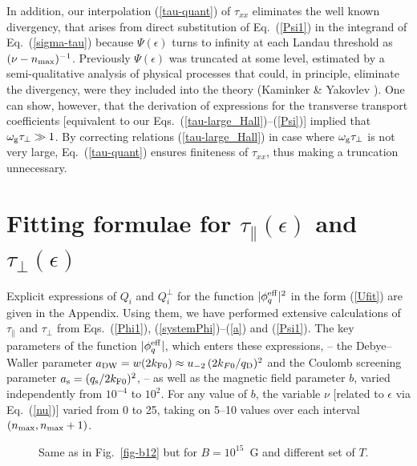 \documentclass{aa}
\newcommand{\req}[1]{Eq.~(\ref{#1})}
\newcommand{\omg}{\omega_{\rm g}}
\begin{document}
In addition, our interpolation (\ref{tau-quant}) of $\tau_{xx}$
eliminates the well known divergency,
that arises from direct substitution of \req{Psi1}
in the integrand of \req{sigma-tau} because
$\Psi(\epsilon)$ turns to infinity at each 
Landau threshold as $(\nu - n_{\rm max})^{-1}$.
Previously $\Psi(\epsilon)$
was truncated at some level, estimated 
by a semi-qualitative analysis of physical
processes that could, in principle, eliminate the divergency,
were they included into the theory
(Kaminker \& Yakovlev \cite{kayak}).
One can show, however, that the derivation
of expressions for the transverse transport coefficients
[equivalent to our Eqs.~(\ref{tau-large_Hall})--(\ref{Psi})]
implied that $\omg\tau_\perp\gg1$.
By correcting relations (\ref{tau-large_Hall})
in case where $\omg\tau_\perp$ is not very large,
\req{tau-quant} ensures finiteness of $\tau_{xx}$,
thus making a truncation unnecessary.

\section{Fitting formulae for $\tau_\|(\epsilon)$
and $\tau_\perp(\epsilon)$}
\label{sect-fitPhiPsi}
Explicit expressions of $Q_i$ and $Q_i^\perp$
for the function $|\phi_q^{\rm eff}|^2$ in the form (\ref{Ufit})
are given in the Appendix.
Using them,
we have performed extensive calculations
of $\tau_\|$ and $\tau_\perp$ from Eqs.~(\ref{Phi1}),
(\ref{systemPhi})--(\ref{a})
and (\ref{Psi1}).
The key parameters of the function $|\phi_q^{\rm eff}|$, which enters
these expressions,
--
the Debye--Waller parameter 
$a_{\rm DW} = w(2k_{\rm F0})\approx u_{-2}\,(2k_{F0}/q_{\rm D})^2$
and the Coulomb screening parameter
$a_{\rm s} = (q_{\rm s}/2k_{\rm F0})^2$, --
as well as the magnetic field parameter $b$,
varied independently from $10^{-4}$ to $10^2$.
For any value of $b$, the variable
$\nu$ [related to $\epsilon$ via \req{nu}] varied from 0 to 25,
taking on 5--10 values
over each interval $(n_{\rm max},n_{\rm max}+1)$.

\begin{figure}
\begin{center}
 \leavevmode
\epsfysize=83mm
\end{center}
\caption[]{Same as in Fig.~\protect\ref{fig-b12}
but for $B=10^{15}$~G and different set of $T$.
}
\label{fig-b15}
\end{figure}
\end{document}
